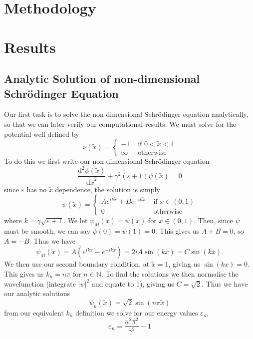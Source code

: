 \documentclass{article}
\theoremstyle{definition}
\theoremstyle{remark}
\begin{document}
\section{Methodology}

\section{Results}


\subsection{Analytic Solution of non-dimensional Schr\"{o}dinger Equation}
Our first task is to solve the non-dimensional Schr\"{o}dinger equation analytically, so that we can later verify our computational results. We must solve for the potential well defined by
\begin{equation}
    \nu(\tilde{x}) = 
        \begin{cases}
            -1 & \text{ if } 0<\tilde{x}<1\\
            \infty & \text{ otherwise}
        \end{cases}
\end{equation}
To do this we first write our non-dimensional Schr\"{o}dinger equation
\begin{equation}
    \frac{\mathrm{d}^2\psi(\tilde{x})}{\mathrm{d}\tilde{x}^2} + \gamma^2(\varepsilon+1)\psi(\tilde{x}) = 0
\end{equation}
since $\varepsilon$ has no $\tilde{x}$ dependence, the solution is simply 
\begin{equation}
    \psi(\tilde{x}) = 
        \begin{cases}
            Ae^{ik\tilde{x}} + Be^{-ik\tilde{x}} & \text{ if }x\in(0,1)\\
            0 & \text{ otherwise}
        \end{cases}
\end{equation}
where $k = \gamma\sqrt{\varepsilon+1}$. We let $\psi_M(\tilde{x}) = \psi(\tilde{x})$ for $x\in (0,1)$. Then, since $\psi$ must be smooth, we can say $\psi(0)=\psi(1)=0$. This gives us $A+B=0$, so $A=-B$. Thus we have
\begin{equation}
    \psi_M(\tilde{x}) = A(e^{ik\tilde{x}}-e^{-ik\tilde{x}}) = 2iA\sin(k\tilde{x}) = C\sin(k\tilde{x}).
\end{equation}
We then use our second boundary condition, at $\tilde{x}=1$, giving us $\sin(kx) = 0$. This gives us $k_n = n\pi$ for $n\in\mathbb{N}$. To find the solutions we then normalise the wavefunction (integrate $|\psi|^2$ and equate to 1), giving us $C=\sqrt{2}$. Thus we have our analytic solutions
\begin{equation}
    \psi_n(\tilde{x}) = \sqrt{2}\sin(n\pi\tilde{x})
\end{equation}
from our equivalent $k_n$ definition we solve for our energy values $\varepsilon_n$,
\begin{equation}
    \varepsilon_n = \frac{n^2\pi^2}{\gamma^2}-1
\end{equation}
\end{document}
